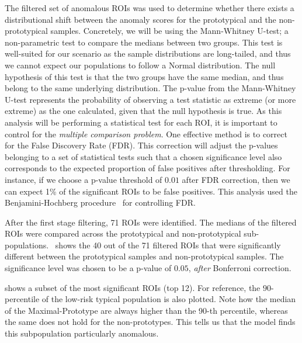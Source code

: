 The filtered set of anomalous ROIs was used to determine whether there exists a distributional shift between the anomaly scores for the prototypical and the non-prototypical samples. Concretely, we will be using the Mann-Whitney U-test; a non-parametric test to compare the medians between two groups.
This test is well-suited for our scenario as the sample distributions are long-tailed, and thus we cannot expect our populations to follow a Normal distribution.
The null hypothesis of this test is that the two groups have the same median, and thus belong to the same underlying distribution. The p-value from the Mann-Whitney U-test represents the probability of observing a test statistic as extreme (or more extreme) as the one calculated, given that the null hypothesis is true. As this analysis will be performing a statistical test for each ROI, it is important to control for the \textit{multiple comparison problem}. One effective method is to correct for the False Discovery Rate (FDR). This correction will adjust the p-values belonging to a set of statistical tests such that a chosen significance level also corresponds to the expected proportion of false positives after thresholding. For instance, if we choose a p-value threshold of $0.01$ after FDR correction, then we can expect 1\% of the significant ROIs to be false positives. This analysis used the Benjamini-Hochberg procedure~\cite{benjamini1995controlling} for controlling FDR.


After the first stage filtering, 71 ROIs were identified. The medians of the filtered ROIs were compared across the prototypical and non-prototypical sub-populations.~ shows the 40 out of the 71 filtered ROIs that were significantly different between the prototypical samples and non-prototypical samples. The significance level was chosen to be a p-value of $0.05$, \textit{after} Bonferroni correction.

 shows a subset of the  most significant ROIs (top 12). For reference, the $90$-percentile of the low-risk typical population is also plotted. Note how the median of the Maximal-Prototype are always higher than the 90-th percentile, whereas the same does not hold for the non-prototypes. This tells us that the model finds this subpopulation particularly anomalous.



